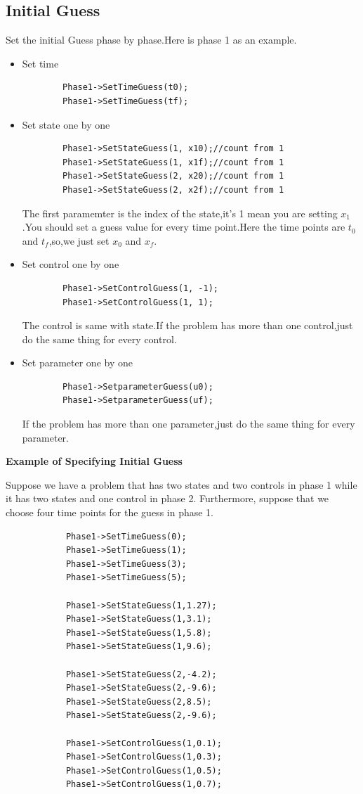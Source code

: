 \documentclass[10pt]{article}
\begin{document}
	\subsection{Initial Guess}
	Set the initial Guess phase by phase.Here is phase 1 as an example.
	 \begin{itemize}
	 	\item Set time\\
	 	\begin{lstlisting}
	 	Phase1->SetTimeGuess(t0);
	 	Phase1->SetTimeGuess(tf);
	 	\end{lstlisting}
	 	\item Set state one by one\\
	 	\begin{lstlisting}
	 	Phase1->SetStateGuess(1, x10);//count from 1
	 	Phase1->SetStateGuess(1, x1f);//count from 1
	 	Phase1->SetStateGuess(2, x20);//count from 1
	 	Phase1->SetStateGuess(2, x2f);//count from 1
	 	\end{lstlisting}
	 	The first paramemter is the index of the state,it's 1 mean you are setting $x_{1}$.You should set a guess value for every time point.Here the time 
	 	points are $t_0$ and $t_f$,so,we just set $x_0$ and $x_f$.
	 	\item Set control one by one
	 	\begin{lstlisting}
	 	Phase1->SetControlGuess(1, -1);
	 	Phase1->SetControlGuess(1, 1);
	 	\end{lstlisting}
	 	The control is same with state.If the problem has more than one control,just do the same thing for every control.
	 	\item Set parameter one by one
	 	\begin{lstlisting}
	 	Phase1->SetparameterGuess(u0);
	 	Phase1->SetparameterGuess(uf);
	 	\end{lstlisting}
	 	If the problem has more than one parameter,just do the same thing for every parameter.	
	 \end{itemize}
	 \begin{frame}
	 	
	 	{\noindent}{\bf Example of Specifying  Initial Guess}

	 	Suppose we have a  problem that has two states and two controls in
	 	phase 1 while it has two states and one control in phase 2.  Furthermore,
	 	suppose that we choose four time points for the guess in phase 1.
	 	\begin{lstlisting}
		 	Phase1->SetTimeGuess(0);
		 	Phase1->SetTimeGuess(1);
		 	Phase1->SetTimeGuess(3);
		 	Phase1->SetTimeGuess(5);
	 	
		 	Phase1->SetStateGuess(1,1.27);
		 	Phase1->SetStateGuess(1,3.1);
		 	Phase1->SetStateGuess(1,5.8);
		 	Phase1->SetStateGuess(1,9.6);
	 	
		 	Phase1->SetStateGuess(2,-4.2);
		 	Phase1->SetStateGuess(2,-9.6);
		 	Phase1->SetStateGuess(2,8.5);
		 	Phase1->SetStateGuess(2,-9.6);
	 	 
		 	Phase1->SetControlGuess(1,0.1);
		 	Phase1->SetControlGuess(1,0.3);
		 	Phase1->SetControlGuess(1,0.5);
		 	Phase1->SetControlGuess(1,0.7);
	 	\end{lstlisting}
	 \end{frame}
\end{document}
